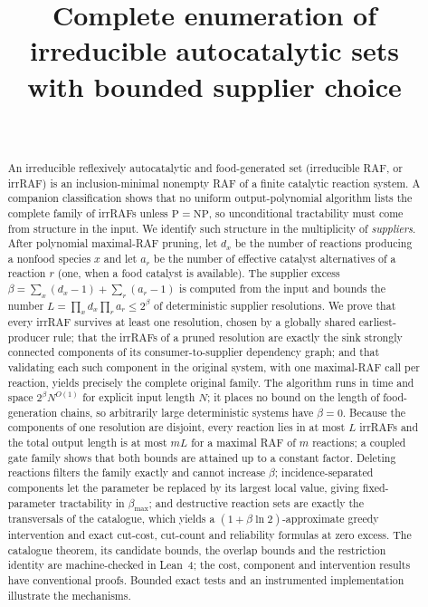 \documentclass[11pt,a4paper]{article}
\title{Complete enumeration of irreducible autocatalytic sets\\ with bounded supplier choice}
\author{\PaperAuthor\\ \PaperAffiliation}
\date{\PaperDate}
\theoremstyle{plain}
\theoremstyle{definition}
\theoremstyle{remark}
\newcommand{\bmax}{\beta_{\max}}
\begin{document}
\maketitle

\begin{abstract}
An irreducible reflexively autocatalytic and food-generated set (irreducible RAF, or irrRAF) is an inclusion-minimal nonempty RAF of a finite catalytic reaction system. A companion classification shows that no uniform output-polynomial algorithm lists the complete family of irrRAFs unless $\mathrm P=\mathrm{NP}$, so unconditional tractability must come from structure in the input. We identify such structure in the multiplicity of \emph{suppliers}. After polynomial maximal-RAF pruning, let $d_x$ be the number of reactions producing a nonfood species $x$ and let $a_r$ be the number of effective catalyst alternatives of a reaction $r$ (one, when a food catalyst is available). The supplier excess $\beta=\sum_x(d_x-1)+\sum_r(a_r-1)$ is computed from the input and bounds the number $L=\prod_xd_x\prod_ra_r\le2^\beta$ of deterministic supplier resolutions. We prove that every irrRAF survives at least one resolution, chosen by a globally shared earliest-producer rule; that the irrRAFs of a pruned resolution are exactly the sink strongly connected components of its consumer-to-supplier dependency graph; and that validating each such component in the original system, with one maximal-RAF call per reaction, yields precisely the complete original family. The algorithm runs in time and space $2^\beta N^{O(1)}$ for explicit input length $N$; it places no bound on the length of food-generation chains, so arbitrarily large deterministic systems have $\beta=0$. Because the components of one resolution are disjoint, every reaction lies in at most $L$ irrRAFs and the total output length is at most $mL$ for a maximal RAF of $m$ reactions; a coupled gate family shows that both bounds are attained up to a constant factor. Deleting reactions filters the family exactly and cannot increase $\beta$; incidence-separated components let the parameter be replaced by its largest local value, giving fixed-parameter tractability in $\bmax$; and destructive reaction sets are exactly the transversals of the catalogue, which yields a $(1+\beta\ln 2)$-approximate greedy intervention and exact cut-cost, cut-count and reliability formulas at zero excess. The catalogue theorem, its candidate bounds, the overlap bounds and the restriction identity are machine-checked in Lean~4; the cost, component and intervention results have conventional proofs. Bounded exact tests and an instrumented implementation illustrate the mechanisms.
\end{abstract}
\end{document}
